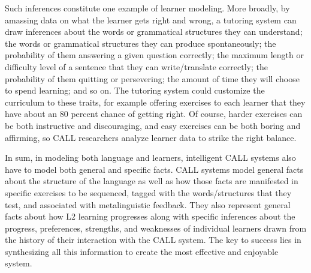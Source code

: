 Such inferences constitute one example of learner modeling.  More broadly, by amassing data on what the learner gets right and wrong, a tutoring system can draw inferences about the words or grammatical structures they can understand; the words or grammatical structures they can produce spontaneously; the probability of them answering a given question correctly; the maximum length or difficulty level of a sentence that they can write/translate correctly; the probability of them quitting or persevering; the amount of time they will choose to spend learning; and so on.   The tutoring system could customize the curriculum to these traits, for example offering exercises to each learner that they have about an 80 percent chance of getting right.  Of course, harder exercises can be both instructive and discouraging, and easy exercises can be both boring and affirming, so CALL researchers analyze learner data to strike the right balance.

In sum, in modeling both language and learners, intelligent CALL systems also have to model both general and specific facts.  CALL systems model general facts about the structure of the language as well as how those facts are manifested in specific exercises to be sequenced, tagged with the words/structures that they test, and associated with metalinguistic feedback.  They also represent general facts about how L2 learning progresses along with specific inferences about the progress, preferences, strengths, and weaknesses of individual learners drawn from the history of their interaction with the CALL system.  The key to success lies in synthesizing all this information to create the most effective and enjoyable system.






